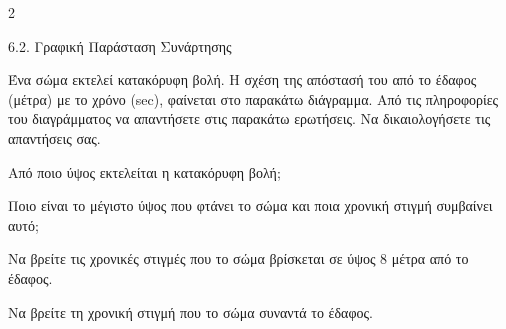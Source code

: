 
\begin{ylh}{2}
    \item 6.2. Γραφική Παράσταση Συνάρτησης
\end{ylh}
Ένα σώμα εκτελεί κατακόρυφη βολή. Η σχέση της απόστασή του από το έδαφος (μέτρα) με το χρόνο (sec), φαίνεται στο παρακάτω διάγραμμα. Από τις πληροφορίες του διαγράμματος να απαντήσετε στις παρακάτω ερωτήσεις. Να δικαιολογήσετε τις απαντήσεις σας.
\begin{center}
\end{center}
\begin{alist}
\item Από ποιο ύψος εκτελείται η κατακόρυφη βολή;
\item Ποιο είναι το μέγιστο ύψος που φτάνει το σώμα και ποια χρονική στιγμή συμβαίνει αυτό; 
\item Να βρείτε τις χρονικές στιγμές που το σώμα βρίσκεται σε ύψος 8 μέτρα από το έδαφος. 
\item Να βρείτε τη χρονική στιγμή που το σώμα συναντά το έδαφος.
\end{alist}

